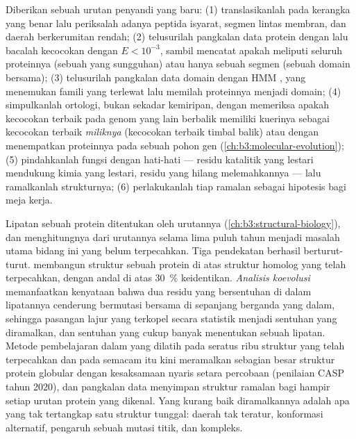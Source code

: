 \begin{method}\label{met:b3:bioinformatics:annotate}
Diberikan sebuah urutan penyandi yang baru: (1) translasikanlah pada kerangka
yang benar lalu periksalah adanya peptida isyarat, segmen lintas membran, dan
daerah berkerumitan rendah; (2) telusurilah pangkalan data protein dengan
 lalu bacalah kecocokan dengan $E < 10^{-3}$, sambil mencatat apakah
 meliputi seluruh proteinnya (sebuah  yang sungguhan) atau
hanya sebuah segmen (sebuah domain bersama); (3) telusurilah pangkalan data
domain dengan HMM , yang menemukan famili yang terlewat  lalu
memilah proteinnya menjadi domain; (4) simpulkanlah ortologi, bukan sekadar
kemiripan, dengan memeriksa apakah kecocokan terbaik pada genom yang lain
berbalik memiliki kuerinya sebagai kecocokan terbaik \emph{miliknya}
(kecocokan terbaik timbal balik) atau dengan menempatkan proteinnya pada
sebuah pohon gen (\cref{ch:b3:molecular-evolution});
(5) pindahkanlah fungsi  dengan hati-hati --- residu katalitik yang
lestari mendukung kimia yang lestari, residu yang hilang melemahkannya ---
lalu ramalkanlah strukturnya; (6) perlakukanlah tiap ramalan sebagai hipotesis
bagi meja kerja.
\end{method}

\begin{proposition}\label{prop:b3:bioinformatics:structure}
Lipatan sebuah protein ditentukan oleh urutannya
(\cref{ch:b3:structural-biology}), dan menghitungnya dari urutannya selama
lima puluh tahun menjadi masalah utama bidang ini yang belum terpecahkan. Tiga
pendekatan berhasil berturut-turut. \emph{} membangun
struktur sebuah protein di atas struktur homolog yang telah terpecahkan,
dengan andal di atas \qty{30}{\%} keidentikan. \emph{Analisis koevolusi}
memanfaatkan kenyataan bahwa dua residu yang bersentuhan di dalam lipatannya
cenderung bermutasi bersama di sepanjang  berganda yang dalam,
sehingga pasangan lajur yang terkopel secara statistik menjadi sentuhan yang
diramalkan, dan sentuhan yang cukup banyak menentukan sebuah lipatan.
Metode pembelajaran dalam yang dilatih pada seratus ribu struktur yang telah
terpecahkan dan pada  semacam itu kini meramalkan sebagian besar
struktur protein globular dengan kesaksamaan nyaris setara percobaan
(penilaian CASP tahun 2020), dan pangkalan data menyimpan struktur ramalan
bagi hampir setiap urutan protein yang dikenal. Yang kurang baik diramalkannya
adalah apa yang tak tertangkap satu struktur tunggal: daerah tak teratur,
konformasi alternatif, pengaruh sebuah mutasi titik, dan kompleks.
\end{proposition}

